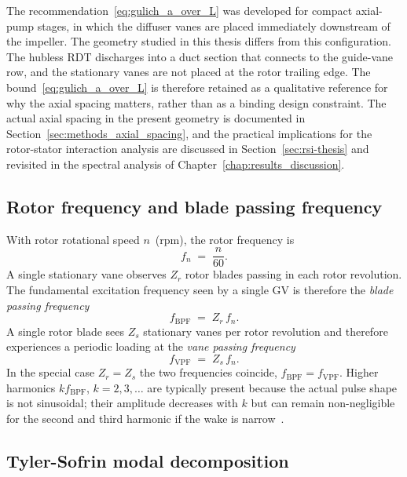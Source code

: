The recommendation~\eqref{eq:gulich_a_over_L} was developed for compact axial-pump stages, in which the diffuser vanes are placed immediately downstream of the impeller. The geometry studied in this thesis differs from this configuration. The hubless RDT discharges into a duct section that connects to the guide-vane row, and the stationary vanes are not placed at the rotor trailing edge. The bound~\eqref{eq:gulich_a_over_L} is therefore retained as a qualitative reference for why the axial spacing matters, rather than as a binding design constraint. The actual axial spacing in the present geometry is documented in Section~\ref{sec:methods_axial_spacing}, and the practical implications for the rotor-stator interaction analysis are discussed in Section~\ref{sec:rsi-thesis} and revisited in the spectral analysis of Chapter~\ref{chap:results_discussion}.

\subsection{Rotor frequency and blade passing frequency}
\label{sec:rsi-bpf}
 
With rotor rotational speed $n$~(rpm), the rotor frequency is
\begin{equation}
    f_n \;=\; \frac{n}{60}. \label{eq:fn}
\end{equation}
A single stationary vane observes $Z_r$ rotor blades passing in each rotor revolution. The fundamental excitation frequency seen by a single GV is therefore the \emph{blade passing frequency}~\cite{Brekke2001}
\begin{equation}
    f_{\mathrm{BPF}} \;=\; Z_r\, f_n. \label{eq:fbpf}
\end{equation}
A single rotor blade sees $Z_s$ stationary vanes per rotor revolution and therefore experiences a periodic loading at the \emph{vane passing frequency}
\begin{equation}
    f_{\mathrm{VPF}} \;=\; Z_s\, f_n. \label{eq:fvpf}
\end{equation}
In the special case $Z_r = Z_s$ the two frequencies coincide, $f_{\mathrm{BPF}} = f_{\mathrm{VPF}}$. Higher harmonics $k f_{\mathrm{BPF}}$, $k=2,3,\dots$ are typically present because the actual pulse shape is not sinusoidal; their amplitude decreases with $k$ but can remain non-negligible for the second and third harmonic if the wake is narrow~\cite{Rodriguez2007}.
 
\subsection{Tyler-Sofrin modal decomposition}
\label{sec:rsi-tyler}
 
